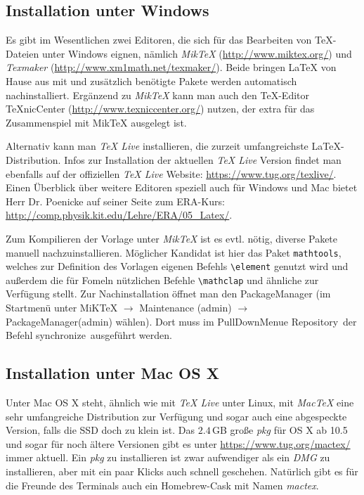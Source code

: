 \subsection{Installation unter Windows}
Es gibt im Wesentlichen zwei Editoren, die sich für das Bearbeiten von TeX-Dateien unter Windows eignen, nämlich \textit{MikTeX} (\url{http://www.miktex.org/}) und \textit{Texmaker} (\url{http://www.xm1math.net/texmaker/}). Beide bringen LaTeX von Hause aus mit und zusätzlich benötigte Pakete werden automatisch nachinstalliert. Ergänzend zu \textit{MikTeX} kann man auch den TeX-Editor TeXnicCenter (\url{http://www.texniccenter.org/}) nutzen, der extra für das Zusammenspiel mit MikTeX ausgelegt ist.

Alternativ kann man \textit{TeX Live} installieren, die zurzeit umfangreichste LaTeX-Distribution. Infos zur Installation der aktuellen \textit{TeX Live} Version findet man ebenfalls auf der offiziellen \textit{TeX Live} Website: \url{https://www.tug.org/texlive/}. Einen Überblick über weitere Editoren speziell auch für Windows und Mac bietet Herr Dr. Poenicke auf seiner Seite zum ERA-Kurs: \url{http://comp.physik.kit.edu/Lehre/ERA/05_Latex/}.

Zum Kompilieren der Vorlage unter \textit{MikTeX} ist es evtl. nötig, diverse Pakete manuell nachzuinstallieren. Möglicher Kandidat ist hier das Paket \verb|mathtools|, welches zur Definition des Vorlagen eigenen Befehls \verb|\element| genutzt wird und außerdem die für Fomeln nützlichen Befehle \verb|\mathclap| und ähnliche zur Verfügung stellt. Zur Nachinstallation öffnet man den PackageManager (im Startmenü unter MiKTeX $\rightarrow$ Maintenance (admin) $\rightarrow$ PackageManager(admin) wählen). Dort muss im PullDownMenue \glqq Repository\grqq\ der Befehl \glqq synchronize\grqq\ ausgeführt werden.

\subsection{Installation unter Mac OS X}
Unter Mac OS X steht, ähnlich wie mit \textit{TeX Live} unter Linux, mit \textit{MacTeX} eine sehr umfangreiche Distribution zur Verfügung und sogar auch eine abgespeckte Version, falls die SSD doch zu klein ist. Das $2.4$\,GB große \textit{pkg} für OS X ab 10.5 und sogar für noch ältere Versionen gibt es unter \url{https://www.tug.org/mactex/} immer aktuell. Ein \textit{pkg} zu installieren ist zwar aufwendiger als ein \textit{DMG} zu installieren, aber mit ein paar Klicks auch schnell geschehen. Natürlich gibt es für die Freunde des Terminals auch ein Homebrew-Cask mit Namen \textit{mactex}.


